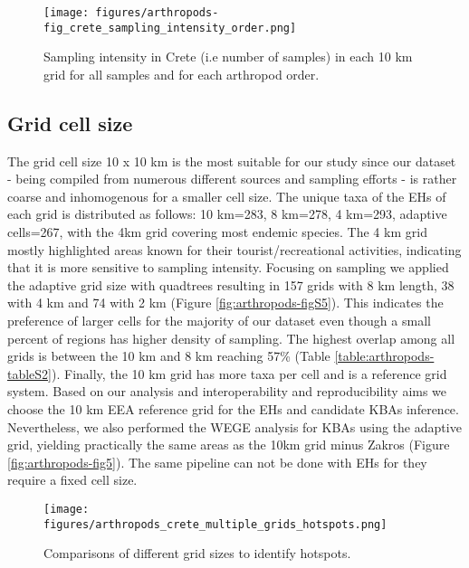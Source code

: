    \begin{figure}[htp!]
      \centering
      \texttt{[image: figures/arthropods-fig\_crete\_sampling\_intensity\_order.png]}
      \caption[Sampling intensity]{Sampling intensity in Crete (i.e number of samples) in each 10 km grid for all samples and for each arthropod order.}
      \label{fig:arthropods-sampling-intesity}
   \end{figure}

    \subsection{Grid cell size}
    \label{subsec:arthropods-grids}
The grid cell size 10 x 10 km is the most suitable for our study since our
dataset - being compiled from numerous different sources and sampling efforts -
is rather coarse and inhomogenous for a smaller cell size.
The unique taxa of the EHs of each grid is distributed as follows: 10 km=283,
8 km=278, 4 km=293, adaptive cells=267, with the 4km grid covering most endemic
species. The 4 km grid mostly highlighted areas known for their tourist/recreational activities,
indicating that it is more sensitive to sampling intensity.
Focusing on sampling we applied the adaptive grid size with quadtrees resulting
in 157 grids with 8 km length, 38 with 4 km and 74 with 2 km (Figure \ref{fig:arthropods-figS5}).
This indicates the preference of larger cells for the majority of our dataset
even though a small percent of regions has higher density of sampling.
The highest overlap among all grids is between the 10 km and 8 km reaching
57\% (Table \ref{table:arthropods-tableS2}). Finally, the 10 km grid has more taxa
per cell and is a reference grid system.
Based on our analysis and interoperability and reproducibility aims we choose
the 10 km EEA reference grid for the EHs and candidate KBAs inference.
Nevertheless, we also performed the WEGE analysis for KBAs using the adaptive
grid, yielding practically the same areas as the 10km grid minus Zakros (Figure \ref{fig:arthropods-fig5}).
The same pipeline can not be done with EHs for they require a fixed cell size.


   \begin{figure}[htp!]
      \centering
      \texttt{[image: figures/arthropods\_crete\_multiple\_grids\_hotspots.png]}
      \caption[Comparisons of different grid sizes]{Comparisons of different grid sizes to identify hotspots.}
      \label{fig:arthropods-different-hotposts}
   \end{figure}

